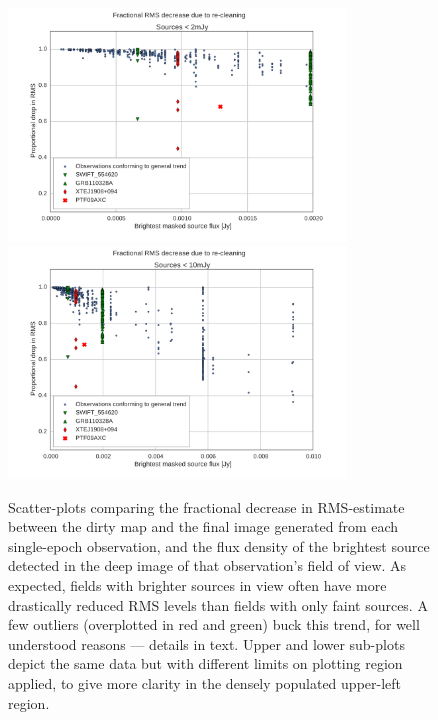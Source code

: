 \documentclass[5p,authoryear]{elsarticle}
\begin{document}
\begin{figure}[p]
\begin{center}  
  \includegraphics[width=0.8\textwidth]{../figures/rms_to_2mjy}
  \includegraphics[width=0.8\textwidth]{../figures/rms_to_10mjy}
  \caption[Fractional RMS decrease vs. brightest source flux]{%
  \label{fig:rms}
  Scatter-plots comparing the fractional decrease in RMS-estimate between the dirty map and the final image generated from each single-epoch observation, and the flux density of the brightest source detected in the deep image of that observation's field of view. 
  As expected, fields with brighter sources in view often have more drastically reduced RMS levels than fields with only faint sources.
  A few outliers (overplotted in red and green) buck this trend, for well understood reasons --- details in text.
  Upper and lower sub-plots depict the same data but with different limits on plotting region applied, to give more clarity in the densely populated upper-left region.
} 
\end{center} 
\end{figure}
\end{document}
